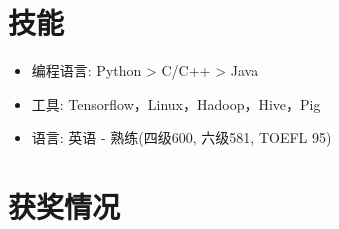 \documentclass{resume}
\begin{document}
\section{技能}
\begin{itemize}[parsep=0.5ex]
  \item 编程语言: Python > C/C++ > Java
  \item 工具: Tensorflow，Linux，Hadoop，Hive，Pig
  \item 语言: 英语 - 熟练(四级600, 六级581, TOEFL 95)

\end{itemize}

\section{获奖情况}

%
%
\end{document}
